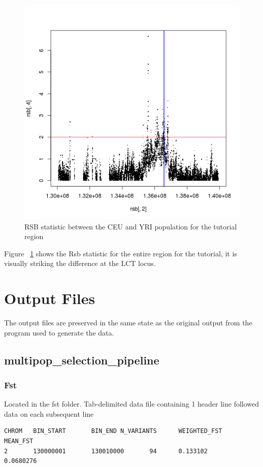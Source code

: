 \documentclass[a4paper,10pt]{article}
\begin{document}
\begin{figure}
\centering
\includegraphics{pictures/RSBCEUYRI.png}
\caption{RSB statistic between the CEU and YRI population for the tutorial region} 
\label{fig:rsb}
\end{figure}
Figure ~\ref{fig:rsb} shows the Rsb statistic for the entire region for the tutorial, it is visually striking the difference at the LCT locus.

\pagebreak
\section{Output Files}
The output files are preserved in the same state as the original output from the program used to generate the data.
\subsection{multipop\_selection\_pipeline}
\subsubsection{Fst}
Located in the fst folder. Tab-delimited data file containing 1 header line followed data on each subsequent line\\
\begin{verbatim}
CHROM   BIN_START       BIN_END N_VARIANTS      WEIGHTED_FST    MEAN_FST  
2       130000001       130010000       94      0.133102        0.0680276 
\end{verbatim}
\end{document}
